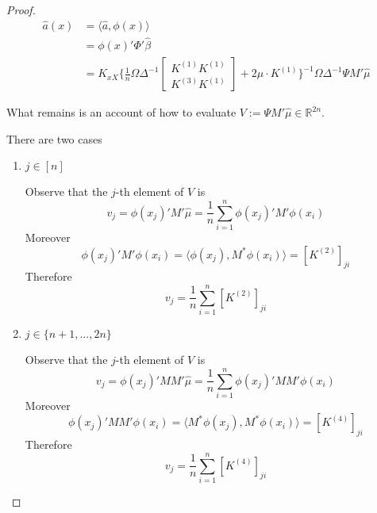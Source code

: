 \begin{proof}
\begin{align}
    \hat{a}(x)&=\langle \hat{a}, \phi(x)\rangle  \\
    &=\phi(x)'\Phi'\hat{\beta} \\
    &=K_{xX}\bigg\{
       \frac{1}{n}\Omega  \Delta^{-1}
        \begin{bmatrix} K^{(1)} K^{(1)} \\ K^{(3)} K^{(1)}\end{bmatrix}
    +2\mu\cdot K^{(1)}\bigg\}^{-1}\Omega\Delta^{-1}\Psi M'\hat{\mu}
\end{align}

What remains is an account of how to evaluate $V:=\Psi M' \hat{\mu}\in\mathbb{R}^{2n}$.

There are two cases
\begin{enumerate}
    \item $j\in [n]$
    
    Observe that the $j$-th element of $V$ is
$$
v_j=\phi(x_j)' M' \hat{\mu}=\frac{1}{n}\sum_{i=1}^n\phi(x_j)' M' \phi(x_i)
$$
Moreover
$$
\phi(x_j)' M' \phi(x_i)= \langle \phi(x_j) ,M^*\phi(x_i) \rangle=[K^{(2)}]_{ji}
$$
Therefore 
$$
v_j=\frac{1}{n}\sum_{i=1}^n   [K^{(2)}]_{ji}
$$
    
    \item $j\in\{n+1,...,2n\}$
    
     Observe that the $j$-th element of $V$ is
$$
v_j=\phi(x_j)' M M' \hat{\mu}=\frac{1}{n}\sum_{i=1}^n\phi(x_j)'M M' \phi(x_i)
$$
Moreover
$$
\phi(x_j)' M M' \phi(x_i)= \langle M^*\phi(x_j) ,M^*\phi(x_i) \rangle= [K^{(4)}]_{ji}
$$
Therefore 
$$
v_j=\frac{1}{n}\sum_{i=1}^n [K^{(4)}]_{ji}
$$
\end{enumerate}
\end{proof}